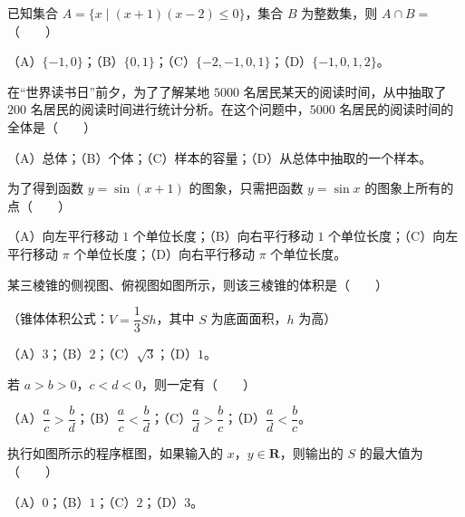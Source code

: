 \begin{question}
已知集合 $A=\{x\mid (x+1)(x-2)\leqslant 0\}$，集合 $B$ 为整数集，则 $A\cap B=$\mbox{（　　）}

（A）$\{-1,0\}$；（B）$\{0,1\}$；（C）$\{-2,-1,0,1\}$；（D）$\{-1,0,1,2\}$。

\end{question}
\begin{question}
在“世界读书日”前夕，为了了解某地 $5000$ 名居民某天的阅读时间，从中抽取了 $200$ 名居民的阅读时间进行统计分析。在这个问题中，$5000$ 名居民的阅读时间的全体是\mbox{（　　）}

（A）总体；（B）个体；（C）样本的容量；（D）从总体中抽取的一个样本。

\end{question}
\begin{question}
为了得到函数 $y=\sin(x+1)$ 的图象，只需把函数 $y=\sin x$ 的图象上所有的点\mbox{（　　）}

（A）向左平行移动 $1$ 个单位长度；（B）向右平行移动 $1$ 个单位长度；（C）向左平行移动 $\pi$ 个单位长度；（D）向右平行移动 $\pi$ 个单位长度。

\Needspace{0.4\textheight}
\end{question}
\begin{question}
某三棱锥的侧视图、俯视图如图所示，则该三棱锥的体积是\mbox{（　　）}

（锥体体积公式：$V=\dfrac13Sh$，其中 $S$ 为底面面积，$h$ 为高）

（A）$3$；（B）$2$；（C）$\sqrt3$；（D）$1$。
\nopagebreak[4]
\begin{center}\end{center}
\nopagebreak[4]
\end{question}
\begin{question}
若 $a>b>0$，$c<d<0$，则一定有\mbox{（　　）}

（A）$\dfrac ac>\dfrac bd$；（B）$\dfrac ac<\dfrac bd$；（C）$\dfrac ad>\dfrac bc$；（D）$\dfrac ad<\dfrac bc$。

\Needspace{0.4\textheight}
\end{question}
\begin{question}
执行如图所示的程序框图，如果输入的 $x$，$y\in\mathbf R$，则输出的 $S$ 的最大值为\mbox{（　　）}

（A）$0$；（B）$1$；（C）$2$；（D）$3$。
\nopagebreak[4]
\begin{center}\end{center}
\nopagebreak[4]
\end{question}

